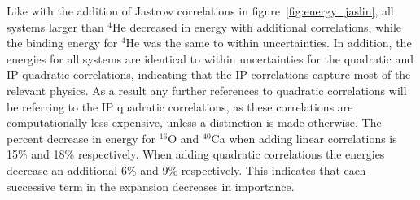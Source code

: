 Like with the addition of Jastrow correlations in figure~\ref{fig:energy_jaslin}, all systems larger than $^4$He decreased in energy with additional correlations, while the binding energy for $^4$He was the same to within uncertainties. In addition, the energies for all systems are identical to within uncertainties for the quadratic and IP quadratic correlations, indicating that the IP correlations capture most of the relevant physics. As a result any further references to quadratic correlations will be referring to the IP quadratic correlations, as these correlations are computationally less expensive, unless a distinction is made otherwise. The percent decrease in energy for $^{16}$O and $^{40}$Ca when adding linear correlations is 15\% and 18\% respectively. When adding quadratic correlations the energies decrease an additional 6\% and 9\% respectively. This indicates that each successive term in the expansion decreases in importance.

